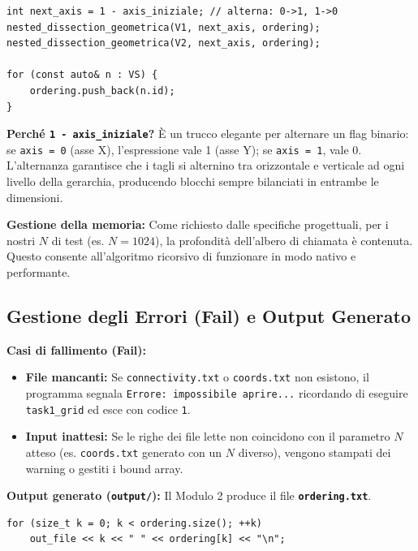 \documentclass[a4paper,11pt]{article}
\theoremstyle{definition}
\begin{document}
\begin{lstlisting}[style=cpp, caption={Alternanza asse e ricorsione}]
int next_axis = 1 - axis_iniziale; // alterna: 0->1, 1->0
nested_dissection_geometrica(V1, next_axis, ordering);
nested_dissection_geometrica(V2, next_axis, ordering);

for (const auto& n : VS) {
    ordering.push_back(n.id);
}
\end{lstlisting}

\textbf{Perché \texttt{1 - axis\_iniziale}?} È un trucco elegante per alternare un flag binario: se \texttt{axis = 0} (asse X), l'espressione vale 1 (asse Y); se \texttt{axis = 1}, vale 0. L'alternanza garantisce che i tagli si alternino tra orizzontale e verticale ad ogni livello della gerarchia, producendo blocchi sempre bilanciati in entrambe le dimensioni.

\textbf{Gestione della memoria:} Come richiesto dalle specifiche progettuali, per i nostri $N$ di test (es. $N=1024$), la profondità dell'albero di chiamata è contenuta. Questo consente all'algoritmo ricorsivo di funzionare in modo nativo e performante.

\subsection{Gestione degli Errori (Fail) e Output Generato}

\textbf{Casi di fallimento (Fail):}
\begin{itemize}
  \item \textbf{File mancanti:} Se \texttt{connectivity.txt} o \texttt{coords.txt} non esistono, il programma segnala \texttt{Errore: impossibile aprire...} ricordando di eseguire \texttt{task1\_grid} ed esce con codice \texttt{1}.
  \item \textbf{Input inattesi:} Se le righe dei file lette non coincidono con il parametro $N$ atteso (es. \texttt{coords.txt} generato con un $N$ diverso), vengono stampati dei warning o gestiti i bound array.
\end{itemize}

\textbf{Output generato (\texttt{output/}):}
Il Modulo 2 produce il file \textbf{\texttt{ordering.txt}}.

\begin{lstlisting}[style=cpp, caption={Salvataggio: nuova posizione -> vecchio ID}]
for (size_t k = 0; k < ordering.size(); ++k)
    out_file << k << " " << ordering[k] << "\n";
\end{lstlisting}
\end{document}
